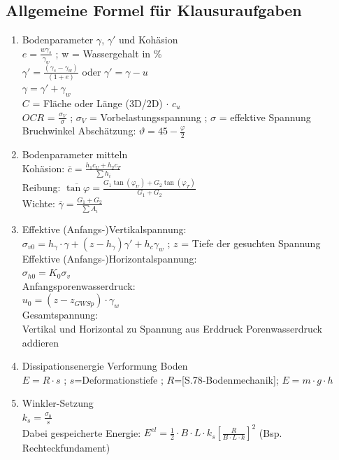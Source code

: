 \documentclass[fleqn,twoside]{article}
\begin{document}
\subsection{Allgemeine Formel für Klausuraufgaben}

\begin{enumerate}
\item Bodenparameter $\gamma$, $\gamma'$ und Kohäsion\\
		$e=\frac{w \gamma_s}{\gamma_w}$ ; w = Wassergehalt in \%\\
		$\gamma' = \frac{(\gamma_s-\gamma_w)}{(1+e)}$ oder $\gamma' = \gamma - u$\\
		$\gamma = \gamma'+\gamma_w$\\
		$C$ =  Fläche oder Länge (3D/2D) $\cdot$ $c_u$\\
		$OCR$ = $\frac{\sigma_V}{ \sigma}$ ; $\sigma_V$ = Vorbelastungsspannung ; $\sigma$ = effektive Spannung\\
		Bruchwinkel Abschätzung: $\vartheta = 45 - \frac{\varphi}{2}$
\item Bodenparameter mitteln\\
		Kohäsion: $\overline{c} = \frac{h_1 c_U + h_2 c_T}{\sum h_i}$\\
		Reibung: $\overline{\tan \varphi} = \frac{G_1 \tan(\varphi_U) + G_2 \tan(\varphi_T)}{G_1 + G_2}$\\
		Wichte: $\overline{\gamma} = \frac{G_1 + G_2}{\sum A_i}$
\item Effektive (Anfangs-)Vertikalspannung:\\
		$\sigma_{v0} = h_{\gamma} \cdot \gamma + (z-h_{\gamma})\gamma' + h_c \gamma_w $ ; $z$ = Tiefe der gesuchten Spannung\\
		Effektive (Anfangs-)Horizontalspannung:\\
		$\sigma_{h0} = K_0 \sigma_v$\\
		Anfangsporenwasserdruck:\\
		$u_0 = (z-z_{GWSp}) \cdot \gamma_w$\\
		Gesamtspannung:\\
		Vertikal und Horizontal zu Spannung aus Erddruck Porenwasserdruck addieren
\item Dissipationsenergie Verformung Boden\\
		$E=R\cdot s$ ; $s$=Deformationstiefe ; $R$=[S.78-Bodenmechanik]; $E = m\cdot g\cdot h$
\item Winkler-Setzung\\
		$k_s=\frac{\sigma_0}{s}$\\
		Dabei gespeicherte Energie: $E^{el}=\frac{1}{2}\cdot B\cdot L\cdot k_s\left[\frac{R}{B\cdot L\cdot k}\right]^2$ (Bsp. Rechteckfundament)

\end{enumerate}
\end{document}
